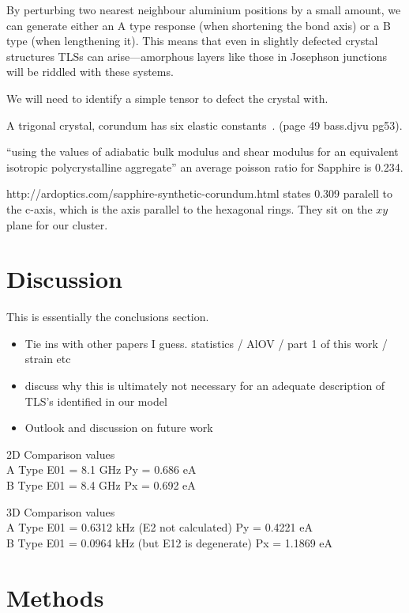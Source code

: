By perturbing two nearest neighbour aluminium positions by a small amount, we can generate either an A type response (when shortening the bond axis) or a B type (when lengthening it). This means that even in slightly defected crystal structures TLSs can arise---amorphous layers like those in Josephson junctions will be riddled with these systems.

We will need to identify a simple tensor to defect the crystal with.


A trigonal crystal, corundum has six elastic constants~\cite{Bass1995}. (page 49 bass.djvu pg53).

``using the values of adiabatic bulk modulus and shear modulus for an equivalent isotropic polycrystalline aggregate'' an average poisson ratio for Sapphire is 0.234\cite{Gercek2007}.

http://ardoptics.com/sapphire-synthetic-corundum.html states 0.309 paralell to the c-axis, which is the axis parallel to the hexagonal rings. They sit on the $xy$ plane for our cluster.
\section{Discussion}

This is essentially the conclusions section.

\begin{itemize}
    \item Tie ins with other papers I guess. statistics / AlOV / part 1 of this work / strain etc
    \item discuss why this is ultimately not necessary for an adequate description of TLS's identified in our model
    \item Outlook and discussion on future work
\end{itemize}

2D Comparison values\\
A Type E01 = 8.1 GHz Py = 0.686 eA\\
B Type E01 = 8.4 GHz Px = 0.692 eA

3D Comparison values\\
A Type E01 = 0.6312 kHz (E2 not calculated) Py = 0.4221 eA\\
B Type E01 = 0.0964 kHz (but E12 is degenerate) Px = 1.1869 eA

\section{Methods}\label{sec:methods}

